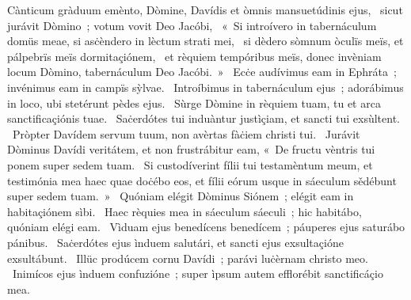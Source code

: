 { Cànticum gràduum}
{%
emènto, Dòmine, Davídis et òmnis mansuetúdinis ejus, 
~sicut jurávit Dòmino~; votum vovit Deo Jacóbi, 
~«~Si introívero in tabernáculum domüs meae, si asċèndero in lèctum strati mei, 
~si dèdero sòmnum òculïs meïs, et pálpebrïs meïs dormitaçiónem, 
~et rèquiem tempóribus meïs, donec invèniam locum Dòmino, tabernáculum Deo Jacóbi.~»
~Ecċe audívimus eam in Ephráta~; invénimus eam in campïs sỳlvae. 
~Introíbimus in tabernáculum ejus~; adorábimus in loco, ubi stetérunt pèdes ejus. 
~Sùrge Dòmine in rèquiem tuam, tu et arca sanctificaçiónis tuae. 
~Saċerdótes tui induàntur justìçiam, et sancti tui exsùltent. 
~Pròpter Davídem servum tuum, non avèrtas fàċiem christi tui. 
~Jurávit Dòminus Davídi veritátem, et non frustrábitur eam, «~De fructu vèntris tui ponem super sedem tuam. 
~Si custodíverint fílii tui testamèntum meum, et testimónia mea haec quae doċébo eos, et fílii eórum usque in sáeculum sědébunt super sedem tuam.~»
~Quóniam elégit Dòminus Siónem~; elégit eam in habitaçiónem sìbi. 
~Haec rèquies mea in sáeculum sáeculi~; hic habitábo, quóniam elégi eam. 
~Vìduam ejus benedícens benedícem~; páuperes ejus saturábo pánibus. 
~Saċerdótes ejus ìnduem salutári, et sancti ejus exsultaçióne exsultábunt. 
~Illüc prodúcem cornu Davídi~; parávi luċèrnam christo meo. 
~Inimícos ejus ìnduem confuzióne~; super ìpsum autem efflorébit sanctificáçio mea. 
}
